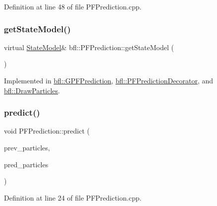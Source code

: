 Definition at line 48 of file P\+F\+Prediction.\+cpp.

\mbox{\label{classbfl_1_1PFPrediction_a1a0f7a1d66a6849c2de10459c6b8f8ac}} 
\subsubsection{\texorpdfstring{get\+State\+Model()}{getStateModel()}}
{\footnotesize\ttfamily virtual \mbox{\hyperlink{classbfl_1_1StateModel}{State\+Model}}\& bfl\+::\+P\+F\+Prediction\+::get\+State\+Model (\begin{DoxyParamCaption}{ }\end{DoxyParamCaption})\hspace{0.3cm}{\ttfamily [pure virtual]}}



Implemented in \mbox{\hyperlink{classbfl_1_1GPFPrediction_a3b8c347633b8db630af4945548980794}{bfl\+::\+G\+P\+F\+Prediction}}, \mbox{\hyperlink{classbfl_1_1PFPredictionDecorator_afad4d92333c84f909c41bd589b839113}{bfl\+::\+P\+F\+Prediction\+Decorator}}, and \mbox{\hyperlink{classbfl_1_1DrawParticles_a7a7ebf5a7ea10747db1bd8ab03390107}{bfl\+::\+Draw\+Particles}}.

\mbox{\label{classbfl_1_1PFPrediction_a129dcd1cccd2da9827ef0c49c90b9345}} 
\subsubsection{\texorpdfstring{predict()}{predict()}}
{\footnotesize\ttfamily void P\+F\+Prediction\+::predict (\begin{DoxyParamCaption}\item[{const \mbox{\hyperlink{classbfl_1_1ParticleSet}{bfl\+::\+Particle\+Set}} \&}]{prev\+\_\+particles,  }\item[{\mbox{\hyperlink{classbfl_1_1ParticleSet}{bfl\+::\+Particle\+Set}} \&}]{pred\+\_\+particles }\end{DoxyParamCaption})}



Definition at line 24 of file P\+F\+Prediction.\+cpp.

